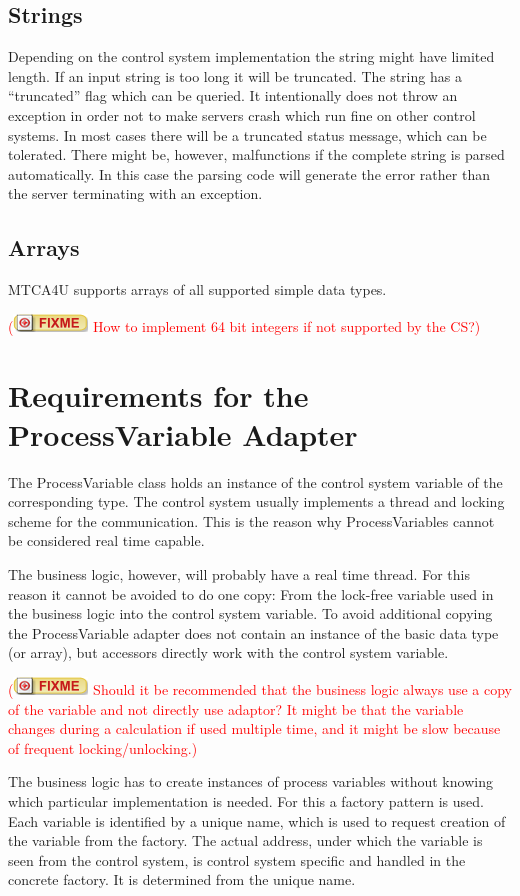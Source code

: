 \documentclass[11pt,a4paper]{scrartcl}
\newcounter{nFixmes}
\newcommand{\fixme}[1]{\addtocounter{nFixmes}{1}\textcolor{red}{(\includegraphics[height=2ex]{fixme} #1)}\xspace}
\begin{document}
\subsection{Strings}

Depending on the control system implementation the string might have limited length. If an input string is too long it will be truncated. The string has a “truncated” flag which can be queried. It intentionally does not throw an exception in order not to make servers crash which run fine on other control systems. In most cases there will be a truncated status message, which can be tolerated. There might be, however, malfunctions if the complete string is parsed automatically. In this case the parsing code will generate the error rather than the server terminating with an exception.

\subsection{Arrays}

MTCA4U supports arrays of all supported simple data types. \fixme{How to implement 64 bit integers if not supported by the CS?}

\section{Requirements for the ProcessVariable Adapter}\label{section_process_variable_adapter}

The ProcessVariable class holds an instance of the control system variable of the corresponding type. The control system usually implements a thread and locking scheme for the communication. This is the reason why ProcessVariables cannot be considered real time capable.

The business logic, however, will probably have a real time thread. For this reason it cannot be avoided to do one copy: From the lock-free variable used in the business logic into the control system variable. To avoid additional copying the ProcessVariable adapter does not contain an instance of the basic data type (or array), but accessors directly work with the control system variable. \fixme{Should it be recommended that the business logic always use a copy of the variable and not directly use adaptor? It might be that the variable changes during a calculation if used multiple time, and it might be slow because of frequent locking/unlocking.} 

The business logic has to create instances of process variables without knowing which particular implementation is needed. For this a factory pattern is used. Each variable is identified by a unique name, which is used to request creation of the variable from the factory. The actual address, under which the variable is seen from the control system, is control system specific and handled in the concrete factory. It is determined from the unique name.
\end{document}
